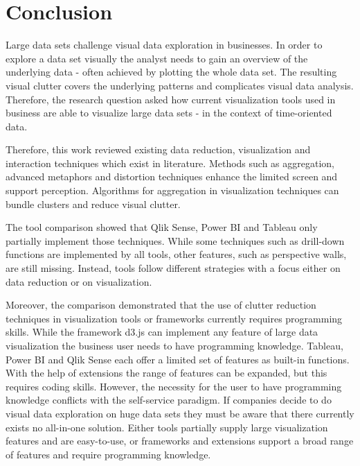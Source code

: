 \section{Conclusion}\label{conclusion}
Large data sets challenge visual data exploration in businesses. In order to explore a data set visually the analyst needs to gain an overview of the underlying data - often achieved by plotting the whole data set. The resulting visual clutter covers the underlying patterns and complicates visual data analysis. Therefore, the research question asked how current visualization tools used in business are able to visualize large data sets - in the context of time-oriented data.  
\par
Therefore, this work reviewed existing data reduction, visualization and interaction techniques which exist in literature. Methods such as aggregation, advanced metaphors and distortion techniques enhance the limited screen and support perception. Algorithms for aggregation in visualization techniques can bundle clusters and reduce visual clutter. 
\par
The tool comparison showed that Qlik Sense, Power BI and Tableau only partially implement those techniques. While some techniques such as drill-down functions  are implemented by all tools, other features, such as perspective walls, are still missing. Instead, tools follow different strategies with a focus either on data reduction or on visualization. 
\par
Moreover, the comparison demonstrated that the use of clutter reduction techniques in visualization tools or frameworks currently requires programming skills.
While the framework d3.js can implement any feature of large data visualization the business user needs to have programming knowledge. Tableau, Power BI and Qlik Sense each offer a limited set of features as built-in functions. With the help of extensions the range of features can be expanded, but this requires coding skills. However, the necessity for the user to have programming knowledge conflicts with the self-service paradigm. If companies decide to do visual data exploration on huge data sets they must be aware that there currently exists no all-in-one solution. Either tools partially supply large visualization features and are easy-to-use, or frameworks and extensions support a broad range of features and require programming knowledge.








